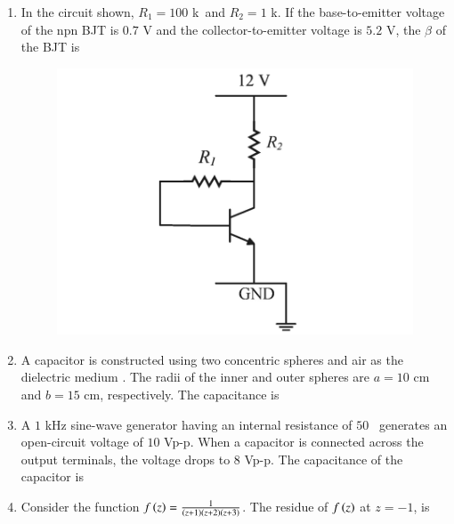 \documentclass[journal,12pt,onecolumn]{IEEEtran}
\theoremstyle{remark}
\begin{document}
\begin{enumerate}
\item In the circuit shown, $R_1=100$ k\ohm \ and $R_2=1$ k\ohm. If the base-to-emitter voltage of the npn BJT is $0.7$ V and the collector-to-emitter voltage is $5.2$ V, the $\beta$  of the BJT is \underline{\hspace{2cm}} 

\hfill{}
\begin{figure}[H]
\includegraphics[width = 0.5\columnwidth]{q58}
\caption*{}
\label{q58}
\end{figure}

\item A capacitor is constructed using two concentric spheres and air as the dielectric medium . The radii of the inner and outer spheres are $a = 10$ cm and $b=15$ cm, respectively. The capacitance  is \underline{\hspace{2cm}} 

\hfill{}

\item A $1$ kHz sine-wave generator having an internal resistance of $50$ \ohm \ generates an open-circuit voltage of $10$ Vp-p. When a capacitor is connected across the output terminals, the voltage drops to $8$ Vp-p. The capacitance of the capacitor  is \underline{\hspace{2cm}} 

\hfill{}

\item Consider the function $f\left(z\right) = \frac{1}{\left(z+1\right)\left(z+2\right)\left(z+3\right)}$. The residue of $f\left(z\right)$ at $z = -1$, is \underline{\hspace{2cm}}

\hfill{}


\end{enumerate}
\end{document}
